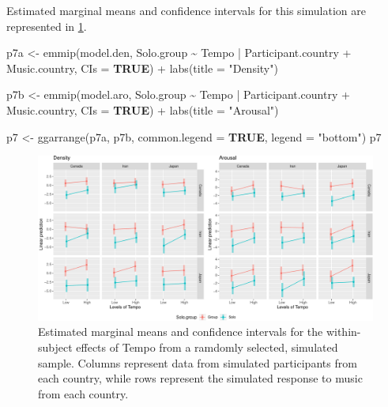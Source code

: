 \documentclass[
  bookmarksnumbered]{article}
\newenvironment{Shaded}{\begin{snugshade}}{\end{snugshade}}
\newcommand{\AttributeTok}[1]{\textcolor[rgb]{0.80,0.80,0.80}{#1}}
\newcommand{\ConstantTok}[1]{\textcolor[rgb]{0.86,0.64,0.64}{\textbf{#1}}}
\newcommand{\FunctionTok}[1]{\textcolor[rgb]{0.94,0.94,0.56}{#1}}
\newcommand{\NormalTok}[1]{\textcolor[rgb]{0.80,0.80,0.80}{#1}}
\newcommand{\OtherTok}[1]{\textcolor[rgb]{0.94,0.94,0.56}{#1}}
\newcommand{\SpecialCharTok}[1]{\textcolor[rgb]{0.86,0.64,0.64}{#1}}
\newcommand{\StringTok}[1]{\textcolor[rgb]{0.80,0.58,0.58}{#1}}
\begin{document}
Estimated marginal means and confidence intervals for this simulation are represented in \ref{fig:plot-mod-ex}.

\begin{Shaded}
\begin{Highlighting}[]
\NormalTok{p7a }\OtherTok{\textless{}{-}} \FunctionTok{emmip}\NormalTok{(model.den, Solo.group }\SpecialCharTok{\textasciitilde{}}\NormalTok{ Tempo }\SpecialCharTok{|}\NormalTok{ Participant.country }\SpecialCharTok{+}\NormalTok{ Music.country,}
      \AttributeTok{CIs =} \ConstantTok{TRUE}\NormalTok{) }\SpecialCharTok{+}
  \FunctionTok{labs}\NormalTok{(}\AttributeTok{title =} \StringTok{"Density"}\NormalTok{)}

\NormalTok{p7b }\OtherTok{\textless{}{-}} \FunctionTok{emmip}\NormalTok{(model.aro, Solo.group }\SpecialCharTok{\textasciitilde{}}\NormalTok{ Tempo }\SpecialCharTok{|}\NormalTok{ Participant.country }\SpecialCharTok{+}\NormalTok{ Music.country,}
      \AttributeTok{CIs =} \ConstantTok{TRUE}\NormalTok{) }\SpecialCharTok{+}
  \FunctionTok{labs}\NormalTok{(}\AttributeTok{title =} \StringTok{"Arousal"}\NormalTok{)}

\NormalTok{p7 }\OtherTok{\textless{}{-}} \FunctionTok{ggarrange}\NormalTok{(p7a, p7b,}
                \AttributeTok{common.legend =} \ConstantTok{TRUE}\NormalTok{,}
                \AttributeTok{legend =} \StringTok{"bottom"}\NormalTok{)}
\NormalTok{p7}
\end{Highlighting}
\end{Shaded}

\begin{figure}
\centering
\includegraphics{Power_analysis_files/figure-latex/plot-mod-ex-1.pdf}
\caption{\label{fig:plot-mod-ex}Estimated marginal means and confidence intervals for the within-subject effects of Tempo from a ramdomly selected, simulated sample. Columns represent data from simulated participants from each country, while rows represent the simulated response to music from each country.}
\end{figure}
\end{document}
